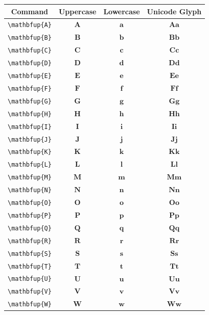 \documentclass[12pt,a4paper]{article}
\begin{document}
\begin{longtable}{|c|c|c|c|}
\hline
\textbf{Command} & \textbf{Uppercase} & \textbf{Lowercase} & \textbf{Unicode Glyph} \\
\hline
\verb|\mathbfup{A}| & $\mathbfup{A}$ & $\mathbfup{a}$ & $ 𝐀 𝐚 $ \\
\verb|\mathbfup{B}| & $\mathbfup{B}$ & $\mathbfup{b}$ & $ 𝐁 𝐛 $ \\
\verb|\mathbfup{C}| & $\mathbfup{C}$ & $\mathbfup{c}$ & $ 𝐂 𝐜 $ \\
\verb|\mathbfup{D}| & $\mathbfup{D}$ & $\mathbfup{d}$ & $ 𝐃 𝐝 $ \\
\verb|\mathbfup{E}| & $\mathbfup{E}$ & $\mathbfup{e}$ & $ 𝐄 𝐞 $ \\
\verb|\mathbfup{F}| & $\mathbfup{F}$ & $\mathbfup{f}$ & $ 𝐅 𝐟 $ \\
\verb|\mathbfup{G}| & $\mathbfup{G}$ & $\mathbfup{g}$ & $ 𝐆 𝐠 $ \\
\verb|\mathbfup{H}| & $\mathbfup{H}$ & $\mathbfup{h}$ & $ 𝐇 𝐡 $ \\
\verb|\mathbfup{I}| & $\mathbfup{I}$ & $\mathbfup{i}$ & $ 𝐈 𝐢 $ \\
\verb|\mathbfup{J}| & $\mathbfup{J}$ & $\mathbfup{j}$ & $ 𝐉 𝐣 $ \\
\verb|\mathbfup{K}| & $\mathbfup{K}$ & $\mathbfup{k}$ & $ 𝐊 𝐤 $ \\
\verb|\mathbfup{L}| & $\mathbfup{L}$ & $\mathbfup{l}$ & $ 𝐋 𝐥 $ \\
\verb|\mathbfup{M}| & $\mathbfup{M}$ & $\mathbfup{m}$ & $ 𝐌 𝐦 $ \\
\verb|\mathbfup{N}| & $\mathbfup{N}$ & $\mathbfup{n}$ & $ 𝐍 𝐧 $ \\
\verb|\mathbfup{O}| & $\mathbfup{O}$ & $\mathbfup{o}$ & $ 𝐎 𝐨 $ \\
\verb|\mathbfup{P}| & $\mathbfup{P}$ & $\mathbfup{p}$ & $ 𝐏 𝐩 $ \\
\verb|\mathbfup{Q}| & $\mathbfup{Q}$ & $\mathbfup{q}$ & $ 𝐐 𝐪 $ \\
\verb|\mathbfup{R}| & $\mathbfup{R}$ & $\mathbfup{r}$ & $ 𝐑 𝐫 $ \\
\verb|\mathbfup{S}| & $\mathbfup{S}$ & $\mathbfup{s}$ & $ 𝐒 𝐬 $ \\
\verb|\mathbfup{T}| & $\mathbfup{T}$ & $\mathbfup{t}$ & $ 𝐓 𝐭 $ \\
\verb|\mathbfup{U}| & $\mathbfup{U}$ & $\mathbfup{u}$ & $ 𝐔 𝐮 $ \\
\verb|\mathbfup{V}| & $\mathbfup{V}$ & $\mathbfup{v}$ & $ 𝐕 𝐯 $ \\
\verb|\mathbfup{W}| & $\mathbfup{W}$ & $\mathbfup{w}$ & $ 𝐖 𝐰 $ \\

\end{longtable}
\end{document}
